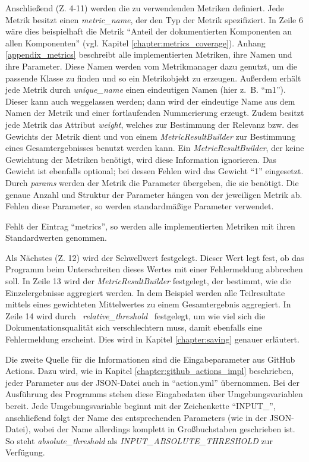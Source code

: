 Anschließend (Z. 4-11) werden die zu verwendenden Metriken definiert. Jede Metrik besitzt einen \textit{metric\_name}, der den Typ der Metrik spezifiziert. In Zeile 6 wäre dies beispielhaft die Metrik \enquote{Anteil der dokumentierten Komponenten an allen Komponenten} (vgl. Kapitel \ref{chapter:metrics_coverage}). Anhang  \ref{appendix_metrics} beschreibt alle implementierten Metriken, ihre Namen und ihre Parameter. Diese Namen werden vom Metrikmanager dazu genutzt, um die passende Klasse zu finden und so ein Metrikobjekt zu erzeugen. Außerdem erhält jede Metrik durch \textit{unique\_name} einen eindeutigen Namen (hier z.~B. \enquote{m1}). Dieser kann auch weggelassen werden; dann wird der eindeutige Name aus dem Namen der Metrik und einer fortlaufenden Nummerierung erzeugt. Zudem besitzt jede Metrik das Attribut \textit{weight}, welches zur Bestimmung der Relevanz bzw. des Gewichts der Metrik dient und von einem \textit{MetricResultBuilder} zur Bestimmung eines Gesamtergebnisses benutzt werden kann. Ein \textit{MetricResultBuilder}, der keine Gewichtung der Metriken benötigt, wird diese Information ignorieren. Das Gewicht ist ebenfalls optional; bei dessen Fehlen wird das Gewicht \enquote{1} eingesetzt.  Durch \textit{params}  werden der Metrik die Parameter übergeben, die sie benötigt. Die genaue Anzahl und Struktur der Parameter hängen von der jeweiligen Metrik ab. Fehlen diese Parameter, so werden standardmäßige Parameter verwendet.

Fehlt der Eintrag \enquote{metrics}, so werden alle implementierten Metriken mit ihren Standardwerten genommen.

Als Nächstes (Z. 12) wird der Schwellwert festgelegt. Dieser Wert legt fest, ob das Programm beim Unterschreiten dieses Wertes mit einer Fehlermeldung abbrechen soll. In Zeile 13 wird der \textit{MetricResultBuilder} festgelegt, der bestimmt, wie die Einzelergebnisse aggregiert werden. In dem Beispiel werden alle Teilresultate mittels eines gewichteten Mittelwertes zu einem Gesamtergebnis aggregiert.  In Zeile 14 wird durch \mbox{\textit{ relative\_threshold }} festgelegt, um wie viel sich die Dokumentationsqualität sich verschlechtern muss, damit ebenfalls eine Fehlermeldung erscheint. Dies wird in Kapitel \ref{chapter:saving} genauer erläutert.



\bigskip
Die zweite Quelle für die Informationen sind die Eingabeparameter aus GitHub Actions. Dazu wird, wie in Kapitel \ref{chapter:github_actions_impl} beschrieben, jeder Parameter aus der \ac{JSON}-Datei auch in \enquote{action.yml} übernommen. Bei der Ausführung des Programms stehen diese Eingabedaten über Umgebungsvariablen bereit. Jede Umgebungsvariable beginnt mit der Zeichenkette \enquote{INPUT\_}, anschließend folgt der Name des entsprechenden Parameters (wie in der \ac{JSON}-Datei), wobei der Name allerdings komplett in Großbuchstaben geschrieben ist. So steht  \textit{absolute\_threshold} als \textit{INPUT\_ABSOLUTE\_THRESHOLD} zur Verfügung.

